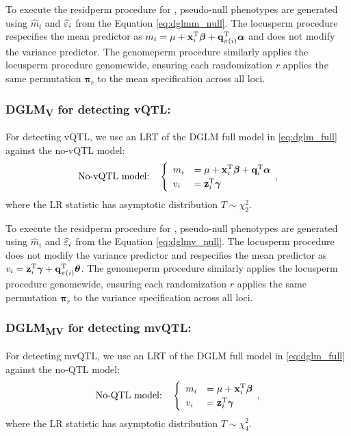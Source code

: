     To execute the residperm procedure for \DGLMm, pseudo-null phenotypes are generated using $\widehat{m}_i$ and $\widehat{\varepsilon}_i$ from the Equation \ref{eq:dglmm_null}.
    The locusperm procedure respecifies the mean predictor as $m_i = \mu + \mathbf{x}_i^\mathrm{T}\bm{\beta} + \mathbf{q}_{\pi(i)}^\mathrm{T}\bm{\alpha}$ and does not modify the variance predictor.
    The genomeperm procedure similarly applies the locusperm procedure genomewide, ensuring each randomization $r$ applies the same permutation $\bm{\pi}_r$ to the mean specification across all loci.

  \subsubsection{DGLM\textsubscript{V} for detecting vQTL:}
    For detecting vQTL, we use an LRT of the {DGLM full model} in \autoref{eq:dglm_full} against the {no-vQTL model}:
    \begin{equation}\label{eq:dglmv_null}
      \text{No-vQTL model:}\quad
      \begin{cases}
      \enskip m_i &= \mu + \mathbf{x}_i^\mathrm{T}\bm{\beta} + \mathbf{q}_i^\mathrm{T}\bm{\alpha}\\
      \enskip v_i &= \mathbf{z}_i^\mathrm{T}\bm{\gamma}
      \end{cases}
      \,,
    \end{equation}
    where the LR statistic has asymptotic distribution $T\sim\chi^2_2$.

    To execute the residperm procedure for \DGLMv, pseudo-null phenotypes are generated using $\widehat{m}_i$ and $\widehat{\varepsilon}_i$ from the Equation \ref{eq:dglmv_null}.
    The locusperm procedure does not modify the variance predictor and respecifies the mean predictor as $v_i = \mathbf{z}_i^\mathrm{T}\bm{\gamma} + \mathbf{q}_{\pi(i)}^\mathrm{T}\bm{\theta}$.
    The genomeperm procedure similarly applies the locusperm procedure genomewide, ensuring each randomization $r$ applies the same permutation $\bm{\pi}_r$ to the variance specification across all loci.

  \subsubsection{DGLM\textsubscript{MV} for detecting mvQTL:}
    For detecting mvQTL, we use an LRT of the {DGLM full model} in \autoref{eq:dglm_full} against the {no-QTL model}:
    \begin{equation}\label{eq:dglmmv_null}
      \text{No-QTL model:}\quad
      \begin{cases}
      \enskip m_i &= \mu + \mathbf{x}_i^\mathrm{T}\bm{\beta} \\
      \enskip v_i &= \mathbf{z}_i^\mathrm{T}\bm{\gamma}
      \end{cases}
      \,,
    \end{equation}
    where the LR statistic has asymptotic distribution $T\sim\chi^2_4$.

